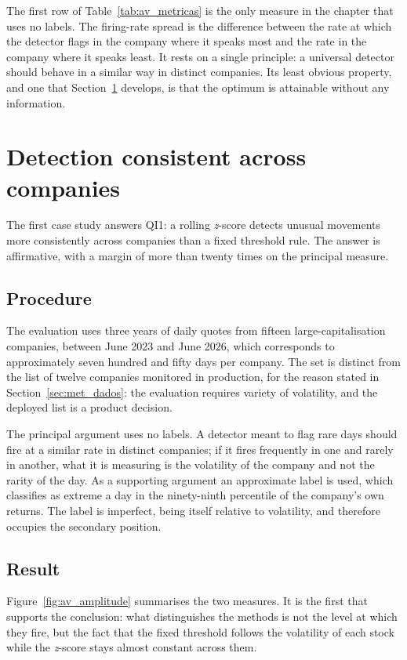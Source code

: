 The first row of Table~\ref{tab:av_metricas} is the only measure in the chapter that uses no
labels. The firing-rate spread is the difference between the rate at which the detector flags in
the company where it speaks most and the rate in the company where it speaks least. It rests on a
single principle: a universal detector should behave in a similar way in distinct companies. Its
least obvious property, and one that Section~\ref{sec:av_qi1} develops, is that the optimum is
attainable without any information.

\section{Detection consistent across companies}
\label{sec:av_qi1}

The first case study answers \gls{QI}1: a rolling \emph{z}-score detects unusual movements more
consistently across companies than a fixed threshold rule. The answer is affirmative, with a margin
of more than twenty times on the principal measure.

\subsection{Procedure}

The evaluation uses three years of daily quotes from fifteen large-capitalisation companies,
between June 2023 and June 2026, which corresponds to approximately seven hundred and fifty days
per company. The set is distinct from the list of twelve companies monitored in production, for the
reason stated in Section~\ref{sec:met_dados}: the evaluation requires variety of volatility, and
the deployed list is a product decision.

The principal argument uses no labels. A detector meant to flag rare days should fire at a similar
rate in distinct companies; if it fires frequently in one and rarely in another, what it is
measuring is the volatility of the company and not the rarity of the day. As a supporting argument
an approximate label is used, which classifies as extreme a day in the ninety-ninth percentile of
the company's own returns. The label is imperfect, being itself relative to volatility, and
therefore occupies the secondary position.

\subsection{Result}

Figure~\ref{fig:av_amplitude} summarises the two measures. It is the first that supports the
conclusion: what distinguishes the methods is not the level at which they fire, but the fact that
the fixed threshold follows the volatility of each stock while the \emph{z}-score stays almost
constant across them.


